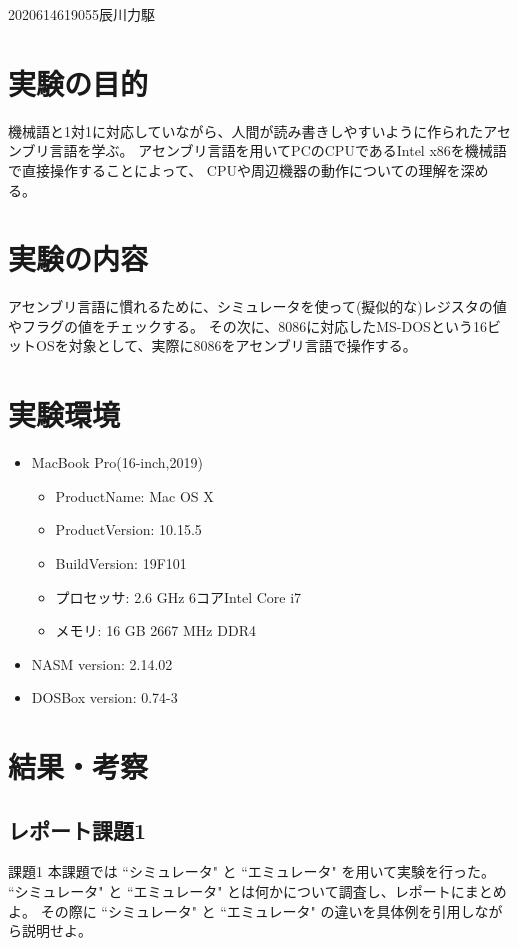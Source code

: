 \documentclass[12pt]{jarticle}
\begin{document}
{2020}{6}{1}{4619055}{辰川力駆}

\section{実験の目的}
機械語と1対1に対応していながら、人間が読み書きしやすいように作られたアセンブリ言語を学ぶ。
アセンブリ言語を用いてPCのCPUであるIntel x86を機械語で直接操作することによって、
CPUや周辺機器の動作についての理解を深める。

\section{実験の内容}
アセンブリ言語に慣れるために、シミュレータを使って(擬似的な)レジスタの値やフラグの値をチェックする。
その次に、8086に対応したMS-DOSという16ビットOSを対象として、実際に8086をアセンブリ言語で操作する。

\section{実験環境}
\begin{itemize}
	\item MacBook Pro(16-inch,2019)
	      \begin{itemize}
		      \item ProductName: Mac OS X
		      \item ProductVersion:	10.15.5
		      \item BuildVersion: 19F101
		      \item プロセッサ: 2.6 GHz 6コアIntel Core i7
		      \item メモリ: 16 GB 2667 MHz DDR4
	      \end{itemize}
	\item NASM version: 2.14.02
	\item DOSBox version: 0.74-3
\end{itemize}

\section{結果・考察}

\subsection{レポート課題1}
\begin{itembox}[l]{課題1}
	本課題では ``シミュレータ" と ``エミュレータ" を用いて実験を行った。
	``シミュレータ" と ``エミュレータ" とは何かについて調査し、レポートにまとめよ。
	その際に ``シミュレータ" と ``エミュレータ" の違いを具体例を引用しながら説明せよ。
\end{itembox}
\end{document}
